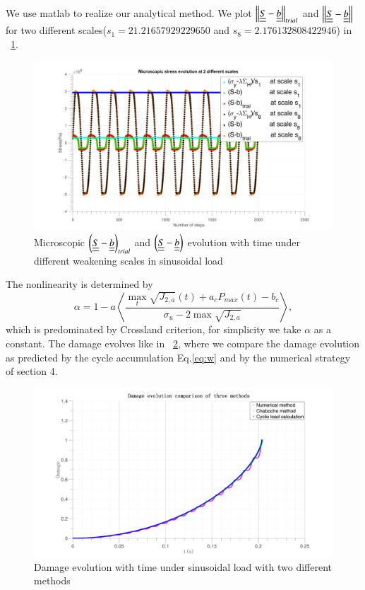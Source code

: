 \documentclass[3p,times,number,review]{elsarticle}
\newcommand{\figref}[1]{\figurename~\ref{#1}}
\begin{document}
We use matlab to realize our analytical method. We plot $\left\|  \uline{\uline{S}}-\uline{\uline{b}}\right\|_{trial}$ and $\left\|  \uline{\uline{S}}-\uline{\uline{b}}\right\|$ for two different scales($s_1=21.21657929229650$ and $s_8=2.176132808422946$) in \figref{trialsin}.
\begin{figure}[!h]
	\centering
	\includegraphics[width=\textwidth]{figures//trialsin.png} 
	\caption{Microscopic $\left(  \uline{\uline{S}}-\uline{\uline{b}}\right)_{trial}$ and $\left( \uline{\uline{S}}-\uline{\uline{b}}\right)$ evolution with time under different weakening scales in sinusoidal load}
	\label{trialsin}
\end{figure}

The nonlinearity is determined by 
$$\alpha=1 - a\left\langle \dfrac{\max\limits_{t}\sqrt{J_{2,a}}(t)+a_c{P_{max}(t)}-b_c}{ \sigma_{u} - 2\max\sqrt{J_{2,a}}}\right\rangle,$$ 
 which is predominated by Crossland criterion, for simplicity we take $\alpha$ as a constant. The damage evolves like in \figref{damsin}, where we compare the damage evolution as predicted by the cycle accumulation Eq.\eqref{eq:w} and by the numerical strategy of section 4.

\begin{figure}[!h]
	\centering
	\includegraphics[width=\textwidth]{figures//damagesin.png} 
	\caption{Damage evolution with time under sinusoidal load with two different methods}
	\label{damsin}
\end{figure}
\end{document}
